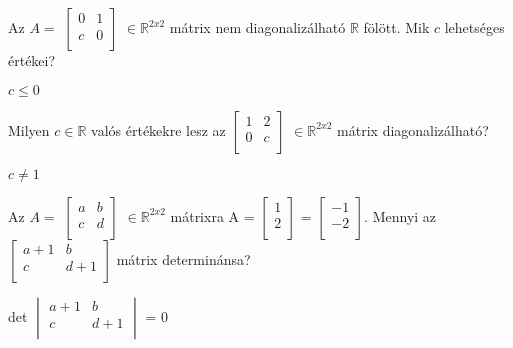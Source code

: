 \begin{frame}
  \begin{tcolorbox}[title={8/4. {\symqueen}}]
    Az $A = $ $\begin{bmatrix} 
  				0 & 1 \\
  				c & 0 \\
			\end{bmatrix}$ $ \in \mathbb{R}^{2 x 2}$ mátrix nem diagonalizálható $\mathbb{R}$ fölött. Mik $c$ lehetséges értékei?


  \tcblower

    \mmedskip 
    
    $c \leq 0$
  \end{tcolorbox}
\end{frame}


\begin{frame}
  \begin{tcolorbox}[title={8/5. {\symqueen}}]
    Milyen $c \in \mathbb{R}$ valós értékekre lesz az $\begin{bmatrix} 
  				1 & 2 \\
  				0 & c \\
			\end{bmatrix}$ $\in \mathbb{R}^{2 x 2}$ mátrix diagonalizálható?

  \tcblower

    \mmedskip 
    
     $c \neq 1$
  \end{tcolorbox}
\end{frame}


\begin{frame}
  \begin{tcolorbox}[title={8/6. {\symqueen}}]
     Az $A =$ $\begin{bmatrix} 
  				a & b \\
  				c & d \\
			\end{bmatrix}$ $\in \mathbb{R}^{2 x 2}$ mátrixra A = $\begin{bmatrix} 
  				1 \\
  				2 \\
			\end{bmatrix}$ = $\begin{bmatrix} 
  				-1 \\
  				-2 \\
			\end{bmatrix}$. Mennyi az $\begin{bmatrix} 
  				a + 1 & b \\
  				c & d + 1 \\
			\end{bmatrix}$ mátrix determinánsa?

  \tcblower

    \mmedskip 
    
     det $\begin{vmatrix} 
  				a + 1 & b \\
  				c & d + 1 \\
			\end{vmatrix}$ = 0
  \end{tcolorbox}
\end{frame}


